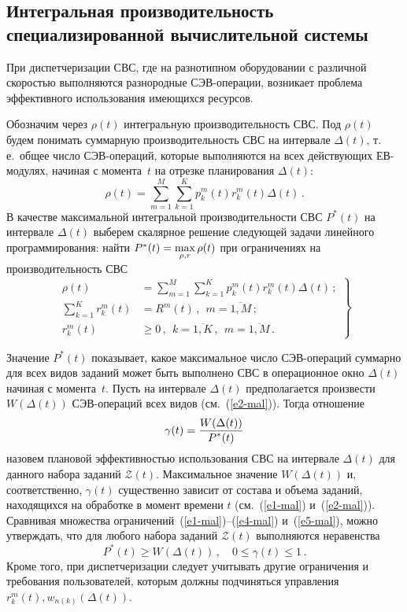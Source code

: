 \begin{multicols}{2}
\section{Интегральная производительность специализированной вычислительной системы}

При диспетчеризации СВС, где на разнотипном оборудовании с различной
скоростью выполняются разнородные СЭВ-опе\-ра\-ции, возникает проблема
эффективного использования имеющихся ресурсов.

Обозначим через $\rho(t)$ интегральную производительность СВС. Под
$\rho(t)$ будем понимать суммарную производительность СВС на
интервале $ \Delta(t)$, т.\,е.\ общее число СЭВ-операций,
которые выполняются на всех  действующих ЕВ-мо\-ду\-лях, начиная с
момента~$t$ на отрезке планирования $ \Delta(t)$:
$$
\rho(t) = \sum\limits_{m = 1}^{M} \sum\limits_{k = 1}^{K}  p_k^m(t) r_k^m(t)  \Delta(t)\,.
$$
В качестве максимальной интегральной производительности СВС $P^*(t)$  на интервале 
$\Delta(t)$ выберем скалярное решение следующей задачи линейного программирования: найти
$
P^*(t) \hm= \max\limits_{\rho, r} \rho(t) 
$
при ограничениях  на производительность СВС
\begin{equation}
\left.  
\begin{array}{rl}
\rho(t) &= \sum\limits_{m = 1}^{M} \sum\limits_{k = 1}^{K}  p_k^m(t) r_k^m(t)  \Delta(t)\,;\\[9pt]
\sum\limits_{k = 1}^{K} r_k^m (t)  &= R^m(t)\,, \  \ m = \overline{1, M}\,;\\[9pt]
r_k^m (t) &\ge 0\,, \ \ k = \overline {1, K}\,, \ \ m = \overline{1,M}\,.
                    \end{array}
                    \right \} 
                    \label{e5-mal}
\end{equation}

Значение $P^*(t) $ показывает, какое максимальное число СЭВ-операций
суммарно для всех видов заданий может быть выполнено СВС в
операционное окно $ \Delta(t)$ начиная с момента~$t$. Пусть на
интервале $ \Delta(t)$ предполагается произвести $W(\Delta(t))$
СЭВ-опе\-ра\-ций всех видов (см.~(\ref{e2-mal})). Тогда отношение
$$
\gamma(t) = \displaystyle\frac{\displaystyle  W(\Delta(t))\mathstrut}{\displaystyle P^*(t)\mathstrut}
$$
назовем плановой эффективностью использования СВС на интервале 
$\Delta(t)$ для данного набора заданий $\mathcal{Z}(t)$. Максимальное значение
$W(\Delta(t))$ и, соответственно, $\gamma (t)$  существенно зависит
от состава и объема заданий, находящихся на обработке в момент
времени $t$ (см.\ (\ref{e1-mal}) и~(\ref{e2-mal})). Сравнивая множества ограничений~(\ref{e1-mal})--(\ref{e4-mal}) 
и~(\ref{e5-mal}), можно утверждать, что для любого набора заданий $\mathcal{Z}(t)$
выполняются неравенства
$$
P^*(t) \ge  W(\Delta(t))\,, \quad 0 \le \gamma(t ) \le 1\,.
$$
Кроме того, при диспетчеризации следует учитывать другие ограничения
и требования пользователей, которым должны подчиняться управ\-ле\-ния
$r_k^m (t), w_{n(k)}(\Delta(t))$.


\end{multicols}
